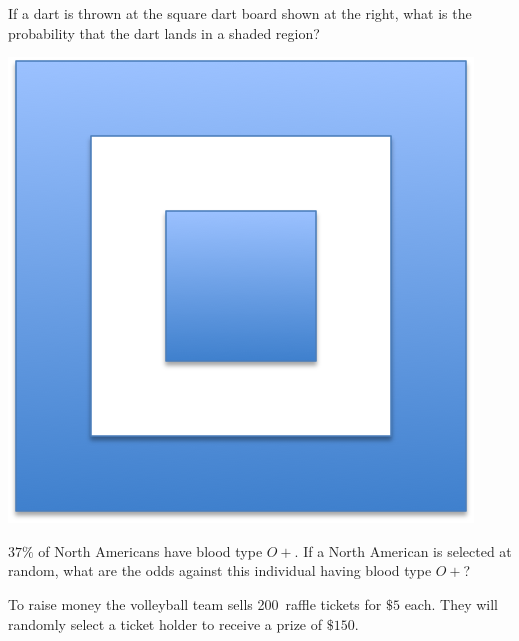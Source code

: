 \documentclass[addpoints,12pt]{exam}
\begin{document}
\begin{questions}

\question[10]
\begin{multicols}{2}
If a dart is thrown at the square dart board shown at the right,
what is the probability that the dart lands in a shaded region?\\
\begin{center}\includegraphics[scale=.5]{Dart}\end{center}
\end{multicols}

\question[8] $37\%$ of North Americans have blood type $O+$.
If a North American is selected at random, what are the odds
against this individual having blood type $O+$?

\question[10] To raise money the volleyball team sells 200~raffle tickets
for $\$5$ each. They will randomly select a ticket holder to receive
a prize of $\$150$.
\end{questions}
\end{document}
